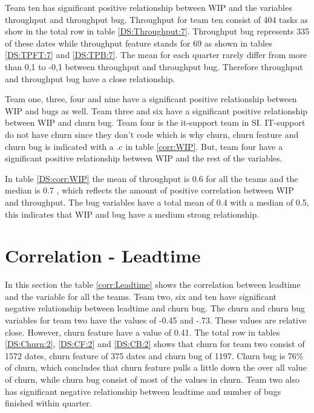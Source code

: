 \documentclass[UKenglish]{ifimaster}  %
\begin{document}
Team ten has significant positive relationship between WIP and the variables throughput and throughput bug. Throughput for team ten consist of 404 tasks as show in the total row in table \ref{DS:Throughput:7}. Throughput bug represents 335 of these dates while throughput feature stands for 69 as shown in tables \ref{DS:TPFT:7} and \ref{DS:TPB:7}. The mean for each quarter rarely differ from more than 0,1 to -0,1 between throughput and throughput bug. Therefore throughput and throughput bug have a close relationship.  

Team one, three, four and nine have a significant positive relationship between WIP and bugs as well. Team three and six have a significant positive relationship between WIP and churn bug. Team four is the it-support team in SI.  IT-support do not have churn since they don't code which is why churn, churn feature and churn bug is indicated with a .c in table \ref{corr:WIP}. But, team four have a significant positive relationship between WIP and the rest of the variables. 

In table \ref{DS:corr:WIP} the mean of throughput is 0.6 for all the teams and the median is 0.7 , which reflects the amount of positive correlation between WIP and throughput. The bug variables have a total mean of 0.4 with a median of 0.5, this indicates that WIP and bug have a medium strong relationship. 


\section{Correlation - Leadtime}
\label{sec:corr:lt}
In this section the table \ref{corr:Leadtime} shows the correlation between leadtime and the variable for all the teams. Team two, six and ten have significant negative relationship between leadtime and churn bug. The churn and churn bug variables for team two have the values of  -0.45 and -.73. These values are relative close.  However, churn feature have a value of 0.41. The total row in tables \ref{DS:Churn:2}, \ref{DS:CF:2} and \ref{DS:CB:2} shows that churn for team two consist of 1572 dates, churn feature of 375 dates and churn bug of 1197. Churn bug is 76\% of churn, which concludes that churn feature pulls a little down the over all value of churn, while churn bug consist of most of the values in churn.  Team two also has significant negative relationship between leadtime and number of bugs finished within quarter. 
\end{document}
